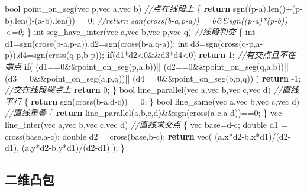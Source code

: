 \documentclass[
]{article}
\newenvironment{Shaded}{}{}
\newcommand{\CommentTok}[1]{\textcolor[rgb]{0.38,0.63,0.69}{\textit{#1}}}
\newcommand{\ControlFlowTok}[1]{\textcolor[rgb]{0.00,0.44,0.13}{\textbf{#1}}}
\newcommand{\DataTypeTok}[1]{\textcolor[rgb]{0.56,0.13,0.00}{#1}}
\newcommand{\DecValTok}[1]{\textcolor[rgb]{0.25,0.63,0.44}{#1}}
\newcommand{\NormalTok}[1]{#1}
\begin{document}
\begin{Shaded}
\begin{Highlighting}[]
\DataTypeTok{bool}\NormalTok{ point\_on\_seg(vec p,vec a,vec b) }\CommentTok{//点在线段上}
\NormalTok{\{}
    \ControlFlowTok{return}\NormalTok{ sgn((p{-}a).len()+(p{-}b).len(){-}(a{-}b).len())==}\DecValTok{0}\NormalTok{;}
    \CommentTok{//return sgn(cross(b{-}a,p{-}a))==0\&\&sgn((p{-}a)*(p{-}b))\textless{}=0;}
\NormalTok{\}}
\DataTypeTok{int}\NormalTok{ seg\_have\_inter(vec a,vec b,vec p,vec q) }\CommentTok{//线段判交}
\NormalTok{\{}
    \DataTypeTok{int}\NormalTok{ d1=sgn(cross(b{-}a,p{-}a)),d2=sgn(cross(b{-}a,q{-}a));}
    \DataTypeTok{int}\NormalTok{ d3=sgn(cross(q{-}p,a{-}p)),d4=sgn(cross(q{-}p,b{-}p));}
    \ControlFlowTok{if}\NormalTok{(d1*d2\textless{}}\DecValTok{0}\NormalTok{\&\&d3*d4\textless{}}\DecValTok{0}\NormalTok{) }\ControlFlowTok{return} \DecValTok{1}\NormalTok{; }\CommentTok{//有交点且不在端点}
    \ControlFlowTok{if}\NormalTok{(}
\NormalTok{        (d1==}\DecValTok{0}\NormalTok{\&\&point\_on\_seg(p,a,b))||}
\NormalTok{        (d2==}\DecValTok{0}\NormalTok{\&\&point\_on\_seg(q,a,b))||}
\NormalTok{        (d3==}\DecValTok{0}\NormalTok{\&\&point\_on\_seg(a,p,q))||}
\NormalTok{        (d4==}\DecValTok{0}\NormalTok{\&\&point\_on\_seg(b,p,q)) }
\NormalTok{    ) }\ControlFlowTok{return}\NormalTok{ {-}}\DecValTok{1}\NormalTok{; }\CommentTok{//交在线段端点上}
    \ControlFlowTok{return} \DecValTok{0}\NormalTok{;}
\NormalTok{\}}
\DataTypeTok{bool}\NormalTok{ line\_parallel(vec a,vec b,vec c,vec d) }\CommentTok{//直线平行}
\NormalTok{\{}
    \ControlFlowTok{return}\NormalTok{ sgn(cross(b{-}a,d{-}c))==}\DecValTok{0}\NormalTok{;}
\NormalTok{\}}
\DataTypeTok{bool}\NormalTok{ line\_same(vec a,vec b,vec c,vec d) }\CommentTok{//直线重叠}
\NormalTok{\{}
    \ControlFlowTok{return}\NormalTok{ line\_parallel(a,b,c,d)\&\&sgn(cross(a{-}c,a{-}d))==}\DecValTok{0}\NormalTok{;}
\NormalTok{\}}
\NormalTok{vec line\_inter(vec a,vec b,vec c,vec d) }\CommentTok{//直线求交点}
\NormalTok{\{}
\NormalTok{    vec base=d{-}c;}
    \DataTypeTok{double}\NormalTok{ d1 = cross(base,a{-}c);}
    \DataTypeTok{double}\NormalTok{ d2 = cross(base,b{-}c);}
    \ControlFlowTok{return}\NormalTok{ vec(}
\NormalTok{        (a.x*d2{-}b.x*d1)/(d2{-}d1),}
\NormalTok{        (a.y*d2{-}b.y*d1)/(d2{-}d1)}
\NormalTok{    );}
\NormalTok{\}}
\end{Highlighting}
\end{Shaded}

\hypertarget{ux4e8cux7ef4ux51f8ux5305}{%
\subsection{二维凸包}\label{ux4e8cux7ef4ux51f8ux5305}}
\end{document}
